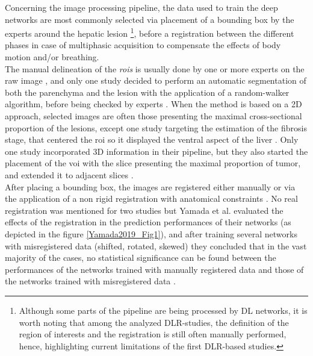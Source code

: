 Concerning the image processing pipeline, the data used to train the
deep networks are most commonly selected via placement of a bounding box
by the experts around the hepatic lesion \footnote{Although some parts of the pipeline are being processed by DL networks, it is worth noting that among the analyzed DLR-studies, the definition of the region of interests and the registration is still often manually performed, hence, highlighting current limitations of the first DLR-based studies.}, before a registration between
the different phases in case of multiphasic acquisition to compensate the
effects of body motion and/or breathing.\\
The manual delineation of the \emph{\ac{roi}s} is usually done by one or more
experts on the raw image \cite{Yamada2019,Wang2018,Yasaka2018a,Yasaka2018,WANG2019,Yang2019}, and only one study decided to perform an automatic segmentation of both the
parenchyma and the lesion with the application of a random-walker
algorithm, before being checked by experts \cite{Liang2018}. 
When the method is based on a 2D approach, selected images are
often those presenting the maximal cross-sectional proportion of the
lesions, except one study targeting the estimation of the fibrosis
stage, that centered the \ac{roi} so it displayed the ventral aspect
of the liver \cite{Yasaka2018a}. Only one study
incorporated 3D information in their pipeline, but they also started the
placement of the \ac{voi} with the slice presenting the maximal
proportion of tumor, and extended it to adjacent slices \cite{Yang2019}.\\
After placing a bounding box, the images are registered either manually \cite{Yamada2019,WANG2019,Wang2018} or
via the application of a non rigid registration with anatomical constraints \cite{Liang2018}. No real registration was mentioned for
two studies \cite{Peng2020,Yasaka2018a} but
Yamada et al. evaluated the effects of the registration in the
prediction performances of their networks (as depicted in the figure \ref{Yamada2019_Fig1}), 
and after training several networks with misregistered data
(shifted, rotated, skewed) they concluded that in the vast majority of
the cases, no statistical significance can be found between the
performances of the networks trained with manually registered data and
those of the networks trained with misregistered data \cite{Yamada2019}.


